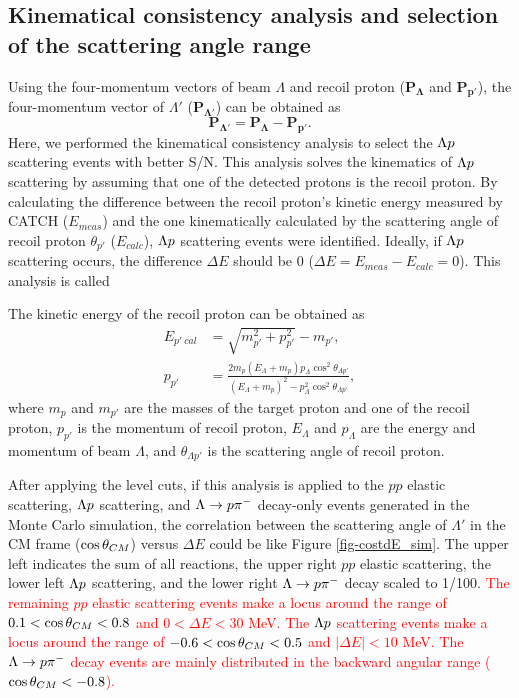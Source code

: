 \subsection{Kinematical consistency analysis and selection of the scattering angle range}
\label{sec-2p_wo_kine}

Using the four-momentum vectors of beam $\Lambda$ and recoil proton ($\bm{P_{\Lambda}}$ and $\bm{P_{p'}}$), the four-momentum vector of $\Lambda'$ ($\bm{P_{\Lambda'}}$) can be obtained as 
\begin{equation}
  \bm{P_{\Lambda'}} = \bm{P_{\Lambda}} - \bm{P_{p'}}. 
\end{equation}
Here, we performed the kinematical consistency analysis to select the $\Lambda p$ scattering events with better S/N. This analysis solves the kinematics of $\Lambda p$ scattering by assuming that one of the detected protons is the recoil proton. By calculating the difference between the recoil proton's kinetic energy measured by CATCH ($E_{meas}$) and the one kinematically calculated by the scattering angle of recoil proton $\theta_{p'}$ ($E_{calc}$), $\Lambda p$ scattering events were identified. Ideally, if $\Lambda p$ scattering occurs, the difference $\Delta E$ should be 0 ($\Delta E = E_{meas} - E_{calc} = 0$). This analysis is called 

The kinetic energy of the recoil proton can be obtained as 
\begin{align}
  E_{p'\ cal} &= \sqrt{m_{p'}^{2} + p_{p'}^{2}} - m_{p'}, \\
  p_{p'} &= \frac{2m_{p}(E_{\Lambda} + m_{p})p_{\Lambda} \cos^{2}{\theta_{\Lambda p'}}} {(E_{\Lambda} + m_{p})^{2} - p_{\Lambda}^{2} \cos^{2}{\theta_{\Lambda p'}}},
  \label{eq-dE_recop}
\end{align}
where $m_{p}$ and $m_{p'}$ are the masses of the target proton and one of the recoil proton, $p_{p'}$ is the momentum of recoil proton, $E_{\Lambda}$ and $p_{\Lambda}$ are the energy and momentum of beam $\Lambda$, and $\theta_{\Lambda p'}$ is the scattering angle of recoil proton. 

After applying the  level cuts, if this analysis is applied to the $pp$ elastic scattering, $\Lambda p$ scattering, and $\Lambda\to p\pi^{-}$ decay-only events generated in the Monte Carlo simulation, the correlation between the scattering angle of $\Lambda'$ in the CM frame ($\cos{\theta}_{CM}$) versus $\Delta E$ could be like Figure \ref{fig-costdE_sim}. The upper left indicates the sum of all reactions, the upper right $pp$ elastic scattering, the lower left $\Lambda p$ scattering, and the lower right $\Lambda\to p\pi^{-}$ decay scaled to 1/100. \textcolor{red}{ The remaining $pp$ elastic scattering events make a locus around the range of $0.1<\cos{\theta}_{CM}<0.8$ and $0<\Delta E<30$ MeV. The $\Lambda p$ scattering events make a locus around the range of $-0.6<\cos{\theta}_{CM}<0.5$ and $|\Delta E|<10$ MeV. The $\Lambda\to p\pi^{-}$ decay events are mainly distributed in the backward angular range ($\cos{\theta}_{CM}<-0.8$). }

